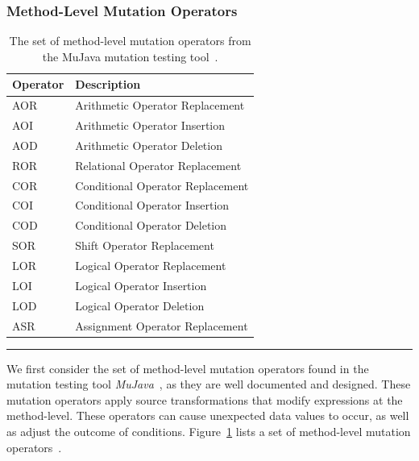 \subsubsection{Method-Level Mutation Operators}
\label{subsubsec:background_method_operators}
\begin{table}[!tb]
  \centering
  \begin{tabular}{|l|l|}
    \hline
    \rowcolor[RGB]{169,196,223}
    \textbf{Operator} & \textbf{Description} \\
    \hline AOR & Arithmetic Operator Replacement \\
    \hline AOI & Arithmetic Operator Insertion \\
    \hline AOD & Arithmetic Operator Deletion \\
    \hline ROR & Relational Operator Replacement \\
    \hline COR & Conditional Operator Replacement \\
    \hline COI & Conditional Operator Insertion \\
    \hline COD & Conditional Operator Deletion \\
    \hline SOR & Shift Operator Replacement \\
    \hline LOR & Logical Operator Replacement \\
    \hline LOI & Logical Operator Insertion \\
    \hline LOD & Logical Operator Deletion \\
    \hline ASR & Assignment Operator Replacement \\
    \hline
  \end{tabular}
  \caption{The set of method-level mutation operators from the MuJava mutation testing tool~\cite{MOK05, MO05a}.}
  \label{tab:method_operators}
  \vspace{2mm}
  \hrule
\end{table}

We first consider the set of method-level mutation operators found in the mutation testing tool \emph{MuJava}~\cite{MOK05}, as they are well documented and designed. These mutation operators apply source transformations that modify expressions at the method-level. These operators can cause unexpected data values to occur, as well as adjust the outcome of conditions. Figure~\ref{tab:method_operators} lists a set of method-level mutation operators~\cite{MO05a}.

